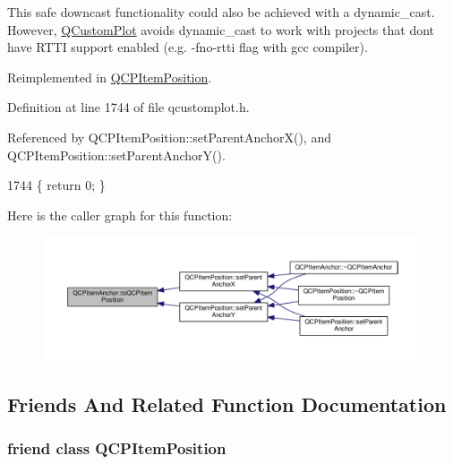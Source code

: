 This safe downcast functionality could also be achieved with a dynamic\+\_\+cast. However, \hyperlink{class_q_custom_plot}{Q\+Custom\+Plot} avoids dynamic\+\_\+cast to work with projects that don\textquotesingle{}t have R\+T\+T\+I support enabled (e.\+g. -\/fno-\/rtti flag with gcc compiler). 

Reimplemented in \hyperlink{class_q_c_p_item_position_a577a7efc601df85a20b3e709d1ac320e}{Q\+C\+P\+Item\+Position}.



Definition at line 1744 of file qcustomplot.\+h.



Referenced by Q\+C\+P\+Item\+Position\+::set\+Parent\+Anchor\+X(), and Q\+C\+P\+Item\+Position\+::set\+Parent\+Anchor\+Y().


\begin{DoxyCode}
1744 \{ \textcolor{keywordflow}{return} 0; \}
\end{DoxyCode}


Here is the caller graph for this function\+:\nopagebreak
\begin{figure}[H]
\begin{center}
\leavevmode
\includegraphics[width=350pt]{class_q_c_p_item_anchor_ac54b20120669950255a63587193dbb86_icgraph}
\end{center}
\end{figure}




\subsection{Friends And Related Function Documentation}
\hypertarget{class_q_c_p_item_anchor_aa9b8ddc062778e202a0be06a57d18d17}{}
\subsubsection[{Q\+C\+P\+Item\+Position}]{\setlength{\rightskip}{0pt plus 5cm}friend class {\bf Q\+C\+P\+Item\+Position}\hspace{0.3cm}{\ttfamily [friend]}}\label{class_q_c_p_item_anchor_aa9b8ddc062778e202a0be06a57d18d17}


